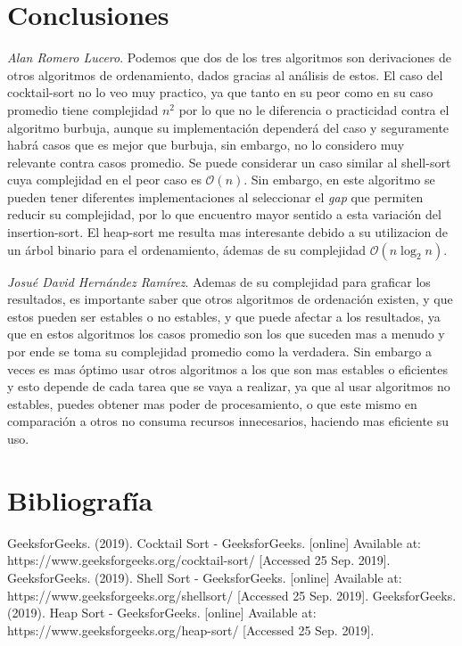 \documentclass[12pt,twoside]{article}
\begin{document}
\section{Conclusiones}

\textit{Alan Romero Lucero}. Podemos que dos de los tres algoritmos son derivaciones de otros algoritmos de ordenamiento, dados gracias al an\'alisis de estos. El caso del cocktail-sort no lo veo muy practico, ya que tanto en su peor como en su caso promedio tiene complejidad $n^2$ por lo que no le diferencia o practicidad contra el algoritmo burbuja, aunque su implementaci\'on depender\'a del caso y seguramente habr\'a casos que es mejor que burbuja, sin embargo, no lo considero muy relevante contra casos promedio. Se puede considerar un caso similar al shell-sort cuya complejidad en el peor caso es $\mathcal{O}(n)$. Sin embargo, en este algoritmo se pueden tener diferentes implementaciones al seleccionar el \textit{gap} que permiten reducir su complejidad, por lo que encuentro mayor sentido a esta variaci\'on del insertion-sort. El heap-sort me resulta mas interesante debido a su utilizacion de un \'arbol binario para el ordenamiento, \'ademas de su complejidad $\mathcal{O}(n\log_2 n)$.


\textit{Josu\'e David Hern\'andez Ram\'irez}. Ademas de su complejidad para graficar los resultados, es importante saber que otros algoritmos de ordenaci\'on existen, y que estos pueden ser estables o no estables, y que puede afectar a los resultados, ya que en estos algoritmos los casos promedio son los que suceden mas a menudo y por ende se toma su complejidad promedio como la verdadera. Sin embargo a veces es mas \'optimo usar otros algoritmos a los que son mas estables o eficientes y esto depende de cada tarea que se vaya a realizar, ya que al usar algoritmos no estables, puedes obtener mas poder de procesamiento, o que este mismo en comparaci\'on a otros no consuma recursos innecesarios, haciendo mas eficiente su uso.
\newpage
\vfill
\clearpage
\section{Bibliograf\'ia}
\newline
GeeksforGeeks. (2019). Cocktail Sort - GeeksforGeeks. [online] Available at: https://www.geeksforgeeks.org/cocktail-sort/ [Accessed 25 Sep. 2019].
\newline\newline
GeeksforGeeks. (2019). Shell Sort - GeeksforGeeks. [online] Available at:
\newline
https://www.geeksforgeeks.org/shellsort/ [Accessed 25 Sep. 2019].
\newline\newline
GeeksforGeeks. (2019). Heap Sort - GeeksforGeeks. [online] Available at:
\newline
https://www.geeksforgeeks.org/heap-sort/ [Accessed 25 Sep. 2019].
\end{document}
